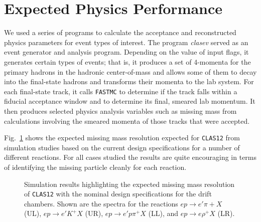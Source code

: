 \section{Expected Physics Performance}

We used a series of programs to calculate the acceptance and reconstructed 
physics parameters for event types of interest.  The program {\it clasev}
\cite{clasev} served as an event generator and analysis program. 
Depending on the value of input flags, it generates certain types of 
events; that is, it produces a set of 4-momenta for the primary hadrons 
in the hadronic center-of-mass and allows some of them to decay into the 
final-state hadrons and transforms their momenta to the lab system.  For 
each final-state track, it calls {\tt FASTMC} to determine if the track 
falls within a fiducial acceptance window and to determine its final, 
smeared lab momentum.  It then produces selected physics analysis variables 
such as missing mass from calculations involving the smeared momenta of 
those tracks that were accepted. 

Fig.~\ref{massplot} shows the expected missing mass resolution 
expected for {\tt CLAS12} from simulation studies based on the current
design specifications for a number of different reactions.  For all
cases studied the results are quite encouraging in terms of identifying
the missing particle cleanly for each reaction.

\begin{figure}[htbp]
\vspace{14.0cm}
\caption{\small{Simulation results highlighting the expected missing
mass resolution of {\tt CLAS12} with the nominal design specifications for
the drift chambers.  Shown are the spectra for the reactions
$ep \to e'\pi+X$ (UL), $ep \to e'K^+X$ (UR), $ep \to e'p\pi^+X$ (LL),
and $ep \to e\rho^+X$ (LR).}}
\label{massplot}
\end{figure}

\vfil
\eject

